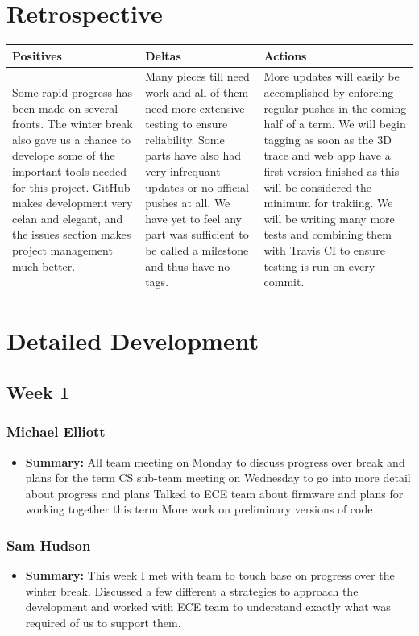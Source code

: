 \documentclass[onecolumn, draftclsnofoot,10pt, compsoc]{IEEEtran}
\begin{document}
\section {Retrospective}
\begin {center}
 \begin {tabular} { | p{5cm} | p{5cm} | p{5cm} | }
 \hline
 Positives & Deltas & Actions \\
 \hline
 Some rapid progress has been made on several fronts. The winter break also gave us a chance to develope some of the important tools needed for this project. GitHub makes development very celan and elegant, and the issues section makes project management much better. & Many pieces till need work and all of them need more extensive testing to ensure reliability. Some parts have also had very infrequant updates or no official pushes at all. We have yet to feel any part was sufficient to be called a milestone and thus have no tags. & More updates will easily be accomplished by enforcing regular pushes in the coming half of a term. We will begin tagging as soon as the 3D trace and web app have a first version finished as this will be considered the minimum for trakiing. We will be writing many more tests and combining them with Travis CI to ensure testing is run on every commit.\\
 \hline
 \end {tabular}
\end {center} 
\section {Detailed Development}
\subsection {Week 1}
\subsubsection{Michael Elliott}
\begin {itemize}
\item \textbf{Summary: }
All team meeting on Monday to discuss progress over break and plans for the term
CS sub-team meeting on Wednesday to go into more detail about progress and plans
Talked to ECE team about firmware and plans for working together this term
More work on preliminary versions of code
\end {itemize}
\subsubsection{Sam Hudson}
\begin {itemize}
\item \textbf{Summary: }This week I met with team to touch base on progress over the winter break. Discussed a few different a strategies to approach the development and worked with ECE team to understand exactly what was required of us to support them.
\end {itemize}
\end{document}
